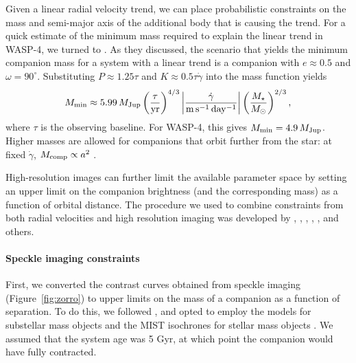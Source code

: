 \documentclass[12pt,twocolumn,tighten]{aastex62}
\begin{document}
Given a linear radial velocity trend, we can place probabilistic constraints on the
mass and semi-major axis of the additional body that is causing the trend.
For a quick estimate of the minimum mass required to explain the linear
trend in WASP-4, we turned to \citet{feng_california_2015}.  As they
discussed, the scenario that yields the minimum companion mass for a
system with a linear trend is a companion with $e\approx0.5$ and
$\omega=90^\circ$.  Substituting $P\approx 1.25\tau$ and $K \approx
0.5\tau \dot{\gamma}$ into the mass function \citep[{\it
e.g.},][]{wright_efficient_2009} yields
\begin{equation}
 M_{\rm min} \approx 5.99\,M_{\rm Jup}
  \left( \frac{\tau}{{\rm yr}} \right)^{4/3}
  \left| \frac{\dot{\gamma}}{{\rm m\,s^{-1}\,day^{-1}}} \right|
  \left( \frac{M_\star}{{M_\odot}} \right)^{2/3},
\end{equation}
where $\tau$ is the observing baseline.  For WASP-4, this gives
$M_{\rm min} = 4.9\,M_{\rm Jup}$.  Higher masses are allowed for
companions that orbit further from the star: at fixed $\dot{\gamma}$,
$M_{\rm comp} \propto a^2$
\citep{torres_substellar_1999,liu_crossing_2002}.

High-resolution images can further limit the available parameter space
by setting an upper limit on the companion brightness (and the corresponding
mass) as a function of orbital distance.  The
procedure we used to combine constraints from both radial velocities
and high resolution imaging was developed by
\citet{wright_linear_trends_2007}, \citet{crepp_trends_2012},
\citet{montet_trends_2014}, \citet{knutson_friends_2014},
\citet{bryan_statistics_2016,bryan_excess_2019}, and others.

\paragraph{Speckle imaging constraints}

First, we converted the contrast curves obtained from
speckle imaging (Figure~\ref{fig:zorro}) to upper limits on the mass of
a companion as a function of separation. To do this, we followed \citet{montet_trends_2014}, and opted to
employ the \citet{baraffe_evolutionary_2003} models for substellar
mass objects and the MIST isochrones for stellar mass objects
\citep{paxton_modules_2011,paxton_modules_2013,paxton_modules_2015,dotter_mesa_2016,choi_mesa_2016}.
We assumed that the system age was 5 Gyr, at which point the companion would
have fully contracted.
\end{document}
